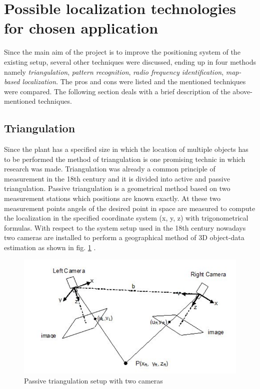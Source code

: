 \section{Possible localization technologies for chosen application} \label{Sec_selectionp}

Since the main aim of the project is to improve the positioning system of the existing setup, several other techniques were discussed, ending up in four methods namely \textit{triangulation}, \textit{pattern recognition}, \textit{radio frequency identification}, \textit{map-based localization}. The pros and cons were listed and the mentioned techniques were compared. The following section deals with a brief description of the above-mentioned techniques.\\

\subsection{Triangulation} %
Since the plant has a specified size in which the location of multiple objects has to be performed the method of triangulation is one promising technic in which research was made. 
Triangulation was already a common principle of measurement in the 18th century and it is divided into active and passive triangulation. Passive triangulation is a geometrical method based on two measurement stations which positions are known exactly. At these two measurement points angels of the desired point in space are measured to compute the localization in the specified coordinate system (x, y, z) with trigonometrical formulas.
With respect to the system setup used in the 18th century nowadays two cameras are installed to perform a geographical method of 3D object-data estimation as shown in fig. \ref{Triangulation} \cite{Prinzip3DVideometrie.}.
\begin{figure}[!htbp]
\centering
\includegraphics[width = 16cm]{Pictures/Triangulation}
\caption{Passive triangulation setup with two cameras}
\label{Triangulation}
\end{figure}\\
